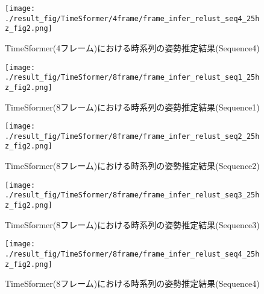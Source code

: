 \begin{figure}[thpb]
  \begin{minipage}[htpb]{1.0\hsize}
  \begin{center}
  \texttt{[image: ./result\_fig/TimeSformer/4frame/frame\_infer\_relust\_seq4\_25hz\_fig2.png]}
  \caption{TimeSformer(4フレーム)における時系列の姿勢推定結果(Sequence4)}
  \end{center}
  \end{minipage}
\end{figure}


\begin{figure}[thpb]
  \begin{minipage}[htpb]{1.0\hsize}
  \begin{center}
  \texttt{[image: ./result\_fig/TimeSformer/8frame/frame\_infer\_relust\_seq1\_25hz\_fig2.png]}
  \caption{TimeSformer(8フレーム)における時系列の姿勢推定結果(Sequence1)}
  \end{center}
  \end{minipage}
\end{figure}

\begin{figure}[thpb]
  \begin{minipage}[htpb]{1.0\hsize}
  \begin{center}
  \texttt{[image: ./result\_fig/TimeSformer/8frame/frame\_infer\_relust\_seq2\_25hz\_fig2.png]}
  \caption{TimeSformer(8フレーム)における時系列の姿勢推定結果(Sequence2)}
  \end{center}
  \end{minipage}
\end{figure}

\begin{figure}[thpb]
  \begin{minipage}[htpb]{1.0\hsize}
  \begin{center}
  \texttt{[image: ./result\_fig/TimeSformer/8frame/frame\_infer\_relust\_seq3\_25hz\_fig2.png]}
  \caption{TimeSformer(8フレーム)における時系列の姿勢推定結果(Sequence3)}
  \end{center}
  \end{minipage}
\end{figure}

\begin{figure}[thpb]
  \begin{minipage}[htpb]{1.0\hsize}
  \begin{center}
  \texttt{[image: ./result\_fig/TimeSformer/8frame/frame\_infer\_relust\_seq4\_25hz\_fig2.png]}
  \caption{TimeSformer(8フレーム)における時系列の姿勢推定結果(Sequence4)}
  \end{center}
  \end{minipage}
\end{figure}

